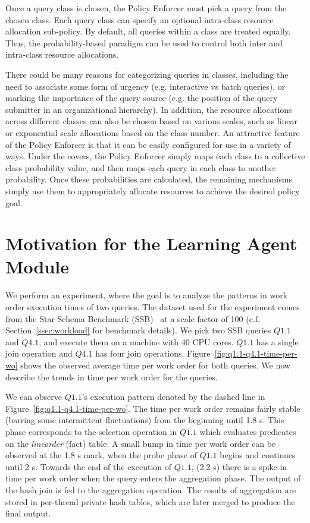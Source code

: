 Once a query class is chosen, the Policy Enforcer must pick a query from the chosen class. 
Each query class can specify an optional intra-class resource allocation sub-policy. 
By default, all queries within a class are treated equally.
Thus, the probability-based paradigm can be used to control both inter and intra-class resource allocations.

There could be many reasons for categorizing queries in classes, including the need to associate some form of urgency (e.g. interactive vs batch queries), or marking the importance of the query source 
(e.g. the position of the query submitter in an organizational hierarchy). 
In addition, the resource allocations across different classes can also be chosen based on various scales, such as linear or exponential scale allocations based on the class number. 
An attractive feature of the Policy Enforcer is that it can be easily configured for use in a variety of ways.
Under the covers, the Policy Enforcer simply maps each class to a collective class probability value, and then maps each query in each class to another probability. 
Once these probabilities are calculated, the remaining mechanisms simply use them to appropriately allocate resources to achieve the desired policy goal.

\section{Motivation for the Learning Agent Module}\label{apx:learning-motivation}
We perform an experiment, where the goal is to analyze the patterns in work order execution times of two queries. 
The dataset used for the experiment comes from the Star Schema Benchmark (SSB)~\cite{ssb} 
at a scale factor of 100 (c.f. Section~\ref{ssec:workload} for benchmark details).
We pick two SSB queries $Q1.1$ and $Q4.1$, and execute them on a machine with 40 CPU cores. 
$Q1.1$ has a single join operation and $Q4.1$ has four join operations.
Figure~\ref{fig:q1.1-q4.1-time-per-wo} shows the observed average time per work order for both queries.
We now describe the trends in time per work order for the queries.

We can observe $Q1.1$'s execution pattern denoted by the dashed line in Figure~\ref{fig:q1.1-q4.1-time-per-wo}. 
The time per work order remains fairly stable (barring some intermittent fluctuations) from the beginning until 1.8 s.
This phase corresponds to the selection operation in $Q1.1$ which evaluates predicates on the \textit{lineorder} (fact) table.
A small bump in time per work order can be observed at the 1.8 s mark, when the probe phase of $Q1.1$ begins and continues until 2 s.
Towards the end of the execution of $Q1.1$, (2.2 s) there is a spike in time per work order when the query enters the aggregation phase. 
The output of the hash join is fed to the aggregation operation. 
The results of aggregation are stored in per-thread private hash tables, which are later merged to produce the final output.


